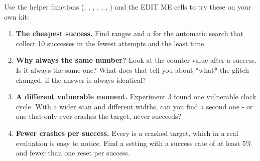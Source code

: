 \documentclass[11pt,letterpaper]{article}
\begin{document}

Use the helper functions (, , , ,
, , ) and the EDIT ME cells to try these on your own kit:

\begin{enumerate}[label=\arabic*.,leftmargin=1.8em,itemsep=2pt,topsep=2pt,parsep=0pt,start=1]
\item \textbf{The cheapest success.} Find ranges and a  for the automatic search that collect 10 successes in the fewest attempts and the least time.
\item \textbf{Why always the same number?} Look at the counter value after a success. Is it always the same one? What does that tell you about *what* the glitch changed, if the answer is always identical?
\item \textbf{A different vulnerable moment.} Experiment 3 found one vulnerable clock cycle. With a wider scan and different widths, can you find a second one - or one that only ever crashes the target, never succeeds?
\item \textbf{Fewer crashes per success.} Every  is a crashed target, which in a real evaluation is easy to notice. Find a setting with a success rate of at least 5\% and fewer than one reset per success.
\end{enumerate}

\end{document}
